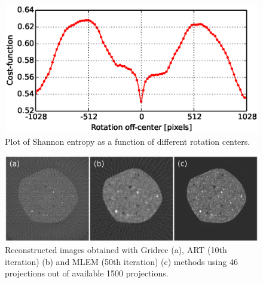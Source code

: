 \documentclass[pdf]{iucr}              %
\begin{document}
\begin{figure}
\centering
\includegraphics[width=\textwidth]{figs/center_costfunc.eps}
\caption{Plot of Shannon entropy as a function of different rotation centers. }
\label{fig:OptimizeCenter2}
\end{figure}


\begin{figure}
\centering
\includegraphics[width=\textwidth]{figs/recon_methods.eps}
\caption{Reconstructed images obtained with Gridrec (a), ART (10th iteration) (b) and MLEM (50th iteration) (c) methods using 46 projections out of available 1500 projections.}
\label{recon_methods}
\end{figure}
\end{document}
